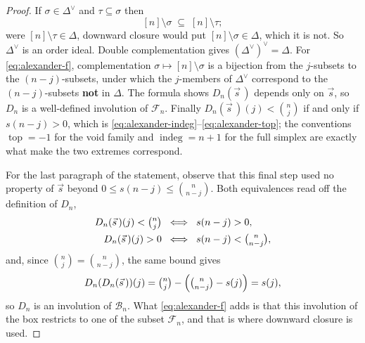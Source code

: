 \documentclass[11pt, a4paper, abstract=yes]{scrartcl}
\theoremstyle{definition}
\theoremstyle{remark}
\theoremstyle{plain}
\newcommand{\indeg}{\operatorname{indeg}}
\newcommand{\tp}{\operatorname{top}}
\begin{document}
\begin{proof}
If \(\sigma\in\Delta^{\vee}\) and \(\tau\subseteq\sigma\) then
\[
  [n]\setminus\sigma\;\subseteq\;[n]\setminus\tau ;
\]
were \([n]\setminus\tau\in\Delta\), downward closure would put
\([n]\setminus\sigma\in\Delta\), which it is not. So \(\Delta^{\vee}\) is an order ideal. Double
complementation gives \((\Delta^{\vee})^{\vee}=\Delta\). For \eqref{eq:alexander-f}, complementation
\(\sigma\mapsto[n]\setminus\sigma\) is a bijection from the \(j\)-subsets to the \((n-j)\)-subsets,
under which the \(j\)-members of \(\Delta^{\vee}\) correspond to the \((n-j)\)-subsets \textbf{not} in
\(\Delta\). The formula shows \(D_n(\vec s\,)\) depends only on \(\vec s\), so \(D_n\) is a well-defined
involution of \(\mathcal F_n\). Finally \(D_n(\vec s\,)(j)<\binom nj\) if and only if \(s(n-j)>0\), which
is \eqref{eq:alexander-indeg}--\eqref{eq:alexander-top}; the conventions \(\tp=-1\) for the void family and
\(\indeg=n+1\) for the full simplex are exactly what make the two extremes correspond.

For the last paragraph of the statement, observe that this final step used no property of \(\vec s\)
beyond \(0\le s(n-j)\le\binom n{n-j}\). Both equivalences read off the definition of \(D_n\),
\begin{align}
  D_n(\vec s\,)(j)<\tbinom nj \;&\iff\; s(n-j)>0 ,\label{eq:D-below}\\
  D_n(\vec s\,)(j)>0 \;&\iff\; s(n-j)<\tbinom n{n-j} ,\label{eq:D-above}
\end{align}
and, since \(\binom nj=\binom n{n-j}\), the same bound gives
\begin{equation}\label{eq:D-involution}
  D_n(D_n(\vec s\,))(j)=\tbinom nj-\Bigl(\tbinom n{n-j}-s(j)\Bigr)=s(j) ,
\end{equation}
so \(D_n\) is an involution of
\(\mathcal B_n\). What \eqref{eq:alexander-f} adds is that this involution of the box restricts to one of the
subset \(\mathcal F_n\), and that is where downward closure is used.
\end{proof}
\end{document}
